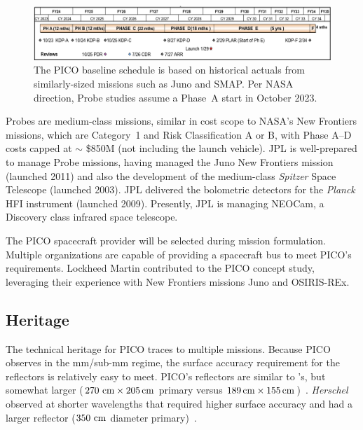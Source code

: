 \begin{figure}[hb]
\begin{center}
\includegraphics[width=\textwidth]{figures/Schedule.png}
\end{center}
\vspace{-0.25in}
\caption{\captiontext The PICO baseline schedule is based on historical actuals from similarly-sized missions such as Juno and SMAP. Per NASA direction, Probe studies assume a Phase~A start in October 2023.\label{fig:Schedule}}
\vspace{-0.05in}
\end{figure}

Probes are medium-class missions, similar in cost scope to NASA's
New Frontiers missions, which are Category~1 and Risk Classification A
or B, with Phase A--D costs capped at $\sim$ \$850M (not including the
launch vehicle). JPL is well-prepared to manage Probe missions, having
managed the Juno New Frontiers mission (launched 2011) and also the
development of the medium-class \textit{Spitzer} Space Telescope (launched
2003). JPL delivered the bolometric detectors for the \textit{Planck}
HFI instrument (launched 2009). Presently, JPL is managing NEOCam, a
Discovery class infrared space telescope.

The PICO spacecraft provider will be selected during mission formulation. Multiple organizations are capable of providing a spacecraft bus to meet PICO's requirements. Lockheed Martin contributed to the PICO concept study, leveraging their experience with New Frontiers missions Juno and OSIRIS-REx.
 
\subsection{Heritage}
\label{sec:heritage} %

The technical heritage for PICO traces to multiple missions. Because PICO observes in the mm/sub-mm regime, the surface accuracy requirement for the reflectors is relatively easy to meet. PICO's reflectors are similar to \planck 's, but somewhat larger ($270 \,\, {\rm cm} \times 205\,{\rm cm}$ primary versus $189\,{\rm cm} \times 155\,{\rm cm}$)~\citep{Gloesener2006}. \textit{Herschel} observed at shorter wavelengths that required higher surface accuracy and had a larger reflector ($350\, \,{\rm cm}$ diameter primary)~\citep{Toulemont2004}.

